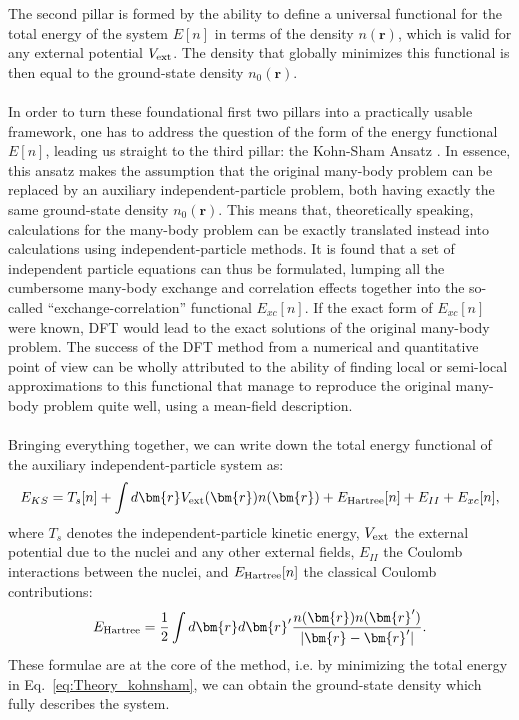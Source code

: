 The second pillar is formed by the ability to define a universal functional for the total energy of the system $E[n]$ in terms of the density $n(\bm{r})$, which is valid for any external potential $V_{\rm ext}$.
The density that globally minimizes this functional is then equal to the ground-state density $n_0(\bm{r})$.
\\\\
In order to turn these foundational first two pillars into a practically usable framework, one has to address the question of the form of the energy functional $E[n]$, leading us straight to the third pillar: the Kohn-Sham Ansatz \cite{Kohn1965}.
In essence, this ansatz makes the assumption that the original many-body problem can be replaced by an auxiliary independent-particle problem, both having exactly the same ground-state density $n_0(\bm{r})$.
This means that, theoretically speaking, calculations for the many-body problem can be exactly translated instead into calculations using independent-particle methods.
It is found that a set of independent particle equations can thus be formulated, lumping all the cumbersome many-body exchange and correlation effects together into the so-called ``exchange-correlation'' functional $E_{xc}[n]$.
If the exact form of $E_{xc}[n]$ were known, DFT would lead to the exact solutions of the original many-body problem.
The success of the DFT method from a numerical and quantitative point of view can be wholly attributed to the ability of finding local or semi-local approximations to this functional that manage to reproduce the original many-body problem quite well, using a mean-field description.
\\\\
Bringing everything together, we can write down the total energy functional of the auxiliary independent-particle system as:
\begin{equation}
	\label{eq:Theory_kohnsham}
	E_{KS} = T_s[n] + \int d\bm{r} V_{\rm ext}(\bm{r}) n(\bm{r}) + E_{\rm Hartree}[n] + E_{II} + E_{xc}[n],
\end{equation}
where $T_s$ denotes the independent-particle kinetic energy, $V_{\rm ext}$ the external potential due to the nuclei and any other external fields, $E_{II}$ the Coulomb interactions between the nuclei, and $E_{\rm Hartree}[n]$ the classical Coulomb contributions:
\begin{equation}
	E_{\rm Hartree} = \frac{1}{2}\int d\bm{r}d\bm{r}' \frac{n(\bm{r})n(\bm{r}')}{|\bm{r} - \bm{r}'|}.
\end{equation}
These formulae are at the core of the method, i.e. by minimizing the total energy in Eq.~\eqref{eq:Theory_kohnsham}, we can obtain the ground-state density which fully describes the system.
